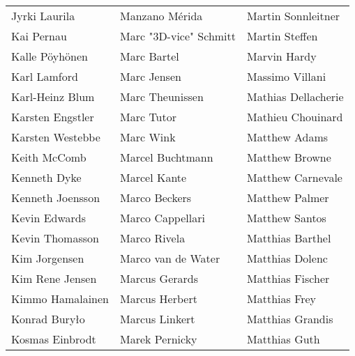\begin{tabular}{p{4.5cm}p{4.5cm}p{4.5cm}}
Jyrki Laurila & Manzano Mérida & Martin Sonnleitner \\
Kai Pernau & Marc "3D-vice" Schmitt & Martin Steffen \\
Kalle Pöyhönen & Marc Bartel & Marvin Hardy \\
Karl Lamford & Marc Jensen & Massimo Villani \\
Karl-Heinz Blum & Marc Theunissen & Mathias Dellacherie \\
Karsten Engstler & Marc Tutor & Mathieu Chouinard \\
Karsten Westebbe & Marc Wink & Matthew Adams \\
Keith McComb & Marcel Buchtmann & Matthew Browne \\
Kenneth Dyke & Marcel Kante & Matthew Carnevale \\
Kenneth Joensson & Marco Beckers & Matthew Palmer \\
Kevin Edwards & Marco Cappellari & Matthew Santos \\
Kevin Thomasson & Marco Rivela & Matthias Barthel \\
Kim Jorgensen & Marco van de Water & Matthias Dolenc \\
Kim Rene Jensen & Marcus Gerards & Matthias Fischer \\
Kimmo Hamalainen & Marcus Herbert & Matthias Frey \\
Konrad Buryło & Marcus Linkert & Matthias Grandis \\
Kosmas Einbrodt & Marek Pernicky & Matthias Guth \\
\end{tabular}
\newpage
\setlength{\tabcolsep}{1mm}
